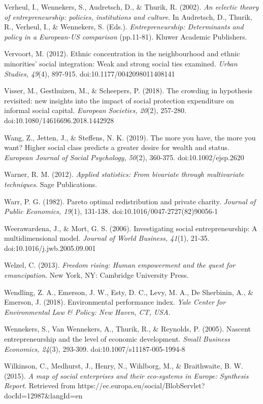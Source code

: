 \documentclass{article}
\begin{document}
Verheul, I., Wennekers, S., Audretsch, D., \& Thurik, R. (2002). \emph{An eclectic theory of entrepreneurship: policies, institutions and culture}. In Audretsch, D., Thurik, R., Verheul, I., \& Wennekers, S. (Eds.). \emph{Entrepreneurship: Determinants and policy in a European-US comparison} (pp.11-81). Kluwer Academic Publishers.

Vervoort, M. (2012). Ethnic concentration in the neighbourhood and ethnic minorities' social integration: Weak and strong social ties examined. \emph{Urban Studies, 49}(4), 897-915. doi:10.1177/0042098011408141

Visser, M., Gesthuizen, M., \& Scheepers, P. (2018). The crowding in hypothesis revisited: new insights into the impact of social protection expenditure on informal social capital. \emph{European Societies, 20}(2), 257-280. doi:10.1080/14616696.2018.1442928

Wang, Z., Jetten, J., \& Steffens, N. K. (2019). The more you have, the more you want? Higher social class predicts a greater desire for wealth and status. \emph{European Journal of Social Psychology, 50}(2), 360-375. doi:10.1002/ejsp.2620

Warner, R. M. (2012). \emph{Applied statistics: From bivariate through multivariate techniques}. Sage Publications.

Warr, P. G. (1982). Pareto optimal redistribution and private charity. \emph{Journal of Public Economics, 19}(1), 131-138. doi:10.1016/0047-2727(82)90056-1

Weerawardena, J., \& Mort, G. S. (2006). Investigating social entrepreneurship: A multidimensional model. \emph{Journal of World Business, 41}(1), 21-35. doi:10.1016/j.jwb.2005.09.001

Welzel, C. (2013). \emph{Freedom rising: Human empowerment and the quest for emancipation}. New York, NY: Cambridge University Press.

Wendling, Z. A., Emerson, J. W., Esty, D. C., Levy, M. A., De Sherbinin, A., \& Emerson, J. (2018). Environmental performance index. \emph{Yale }\emph{Center}\emph{ for Environmental Law \& Policy: New Haven, CT, USA}. 

Wennekers, S., Van Wennekers, A., Thurik, R., \& Reynolds, P. (2005). Nascent entrepreneurship and the level of economic development. \emph{Small Business Economics, 24}(3), 293-309. doi:10.1007/s11187-005-1994-8

Wilkinson, C., Medhurst, J., Henry, N., Wihlborg, M., \& Braithwaite, B. W. (2015). \emph{A map of social enterprises and their eco-systems in Europe: Synthesis Report}. Retrieved from https://ec.europa.eu/social/BlobServlet?docId=12987\&langId=en
\end{document}
